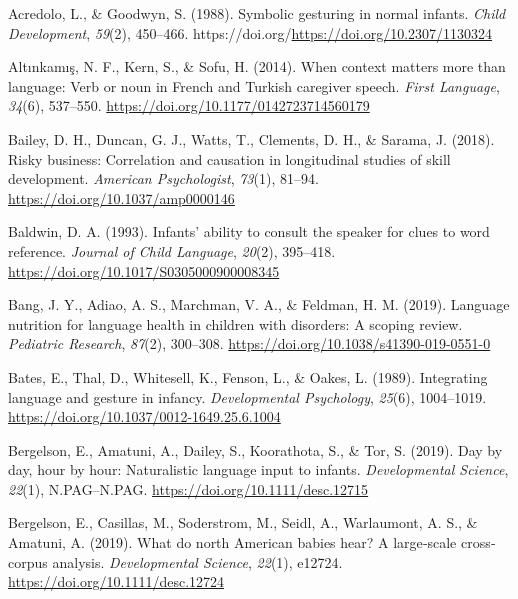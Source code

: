 \documentclass[
  man,floatsintext]{apa6}
\newlength{\cslhangindent}
\newlength{\cslentryspacingunit} %
\newenvironment{CSLReferences}[2] %
 {%
  \setlength{\parindent}{0pt}
  \ifodd #1
  \let\oldpar\par
  \def\par{\hangindent=\cslhangindent\oldpar}
  \fi
  \setlength{\parskip}{#2\cslentryspacingunit}
 }%
 {}
\begin{document}
\hypertarget{refs}{}
\begin{CSLReferences}{1}{0}
\leavevmode{}%
Acredolo, L., \& Goodwyn, S. (1988). Symbolic gesturing in normal infants. \emph{Child Development}, \emph{59}(2), 450--466. https://doi.org/\url{https://doi.org/10.2307/1130324}

\leavevmode{}%
Altınkamış, N. F., Kern, S., \& Sofu, H. (2014). When context matters more than language: {Verb} or noun in {French} and {Turkish} caregiver speech. \emph{First Language}, \emph{34}(6), 537--550. \url{https://doi.org/10.1177/0142723714560179}

\leavevmode{}%
Bailey, D. H., Duncan, G. J., Watts, T., Clements, D. H., \& Sarama, J. (2018). Risky business: {Correlation} and causation in longitudinal studies of skill development. \emph{American Psychologist}, \emph{73}(1), 81--94. \url{https://doi.org/10.1037/amp0000146}

\leavevmode{}%
Baldwin, D. A. (1993). Infants' ability to consult the speaker for clues to word reference. \emph{Journal of Child Language}, \emph{20}(2), 395--418. \url{https://doi.org/10.1017/S0305000900008345}

\leavevmode{}%
Bang, J. Y., Adiao, A. S., Marchman, V. A., \& Feldman, H. M. (2019). Language nutrition for language health in children with disorders: {A} scoping review. \emph{Pediatric Research}, \emph{87}(2), 300--308. \url{https://doi.org/10.1038/s41390-019-0551-0}

\leavevmode{}%
Bates, E., Thal, D., Whitesell, K., Fenson, L., \& Oakes, L. (1989). Integrating language and gesture in infancy. \emph{Developmental Psychology}, \emph{25}(6), 1004--1019. \url{https://doi.org/10.1037/0012-1649.25.6.1004}

\leavevmode{}%
Bergelson, E., Amatuni, A., Dailey, S., Koorathota, S., \& Tor, S. (2019). Day by day, hour by hour: {Naturalistic} language input to infants. \emph{Developmental Science}, \emph{22}(1), N.PAG--N.PAG. \url{https://doi.org/10.1111/desc.12715}

\leavevmode{}%
Bergelson, E., Casillas, M., Soderstrom, M., Seidl, A., Warlaumont, A. S., \& Amatuni, A. (2019). What do north {American} babies hear? {A} large‐scale cross‐corpus analysis. \emph{Developmental Science}, \emph{22}(1), e12724. \url{https://doi.org/10.1111/desc.12724}


\end{CSLReferences}
\end{document}
